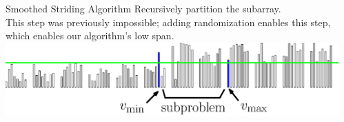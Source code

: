 \documentclass[table,serif,mathserif,final]{beamer}
\theoremstyle{remark}
\begin{document}
\begin{frame}{}
\begin{columns}[t]
\begin{column}{0.5\linewidth}
\begin{block}{\Huge Smoothed Striding Algorithm}
	Recursively partition the subarray.\\
  {\color{blue}This step was previously impossible; adding randomization enables this step, which enables our algorithm's low span. }
	\includegraphics[width=\linewidth]{imgs/smoothedStridingAlgSim/sim45.eps}
\end{block}

  \end{column}
  \begin{column}{0.02\linewidth}
  \end{column}

\end{columns}
\end{frame}
\end{document}
